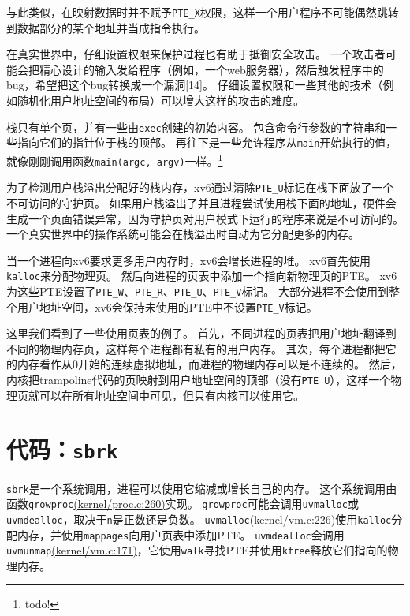 与此类似，在映射数据时并不赋予\texttt{PTE\_X}权限，这样一个用户程序不可能偶然跳转到数据部分的某个地址并当成指令执行。

在真实世界中，仔细设置权限来保护过程也有助于抵御安全攻击。
一个攻击者可能会把精心设计的输入发给程序（例如，一个web服务器），然后触发程序中的bug，希望把这个bug转换成一个漏洞[14]。
仔细设置权限和一些其他的技术（例如随机化用户地址空间的布局）可以增大这样的攻击的难度。

栈只有单个页，并有一些由\texttt{exec}创建的初始内容。
包含命令行参数的字符串和一些指向它们的指针位于栈的顶部。
再往下是一些允许程序从\texttt{main}开始执行的值，就像刚刚调用函数\texttt{main(argc, argv)}一样。\footnote{todo!}

为了检测用户栈溢出分配好的栈内存，xv6通过清除\texttt{PTE\_U}标记在栈下面放了一个不可访问的守护页。
如果用户栈溢出了并且进程尝试使用栈下面的地址，硬件会生成一个页面错误异常，因为守护页对用户模式下运行的程序来说是不可访问的。
一个真实世界中的操作系统可能会在栈溢出时自动为它分配更多的内存。

当一个进程向xv6要求更多用户内存时，xv6会增长进程的堆。
xv6首先使用\texttt{kalloc}来分配物理页。
然后向进程的页表中添加一个指向新物理页的PTE。
xv6为这些PTE设置了\texttt{PTE\_W}、\texttt{PTE\_R}、\texttt{PTE\_U}、\texttt{PTE\_V}标记。
大部分进程不会使用到整个用户地址空间，xv6会保持未使用的PTE中不设置\texttt{PTE\_V}标记。

这里我们看到了一些使用页表的例子。
首先，不同进程的页表把用户地址翻译到不同的物理内存页，这样每个进程都有私有的用户内存。
其次，每个进程都把它的内存看作从0开始的连续虚拟地址，而进程的物理内存可以是不连续的。
然后，内核把trampoline代码的页映射到用户地址空间的顶部（没有\texttt{PTE\_U}），这样一个物理页就可以在所有地址空间中可见，但只有内核可以使用它。

\section{代码：\texttt{sbrk}}
\texttt{sbrk}是一个系统调用，进程可以使用它缩减或增长自己的内存。
这个系统调用由函数\texttt{growproc}\href{https://github.com/mit-pdos/xv6-riscv/blob/riscv/kernel/proc.c#L260}{(kernel/proc.c:260)}实现。
\texttt{growproc}可能会调用\texttt{uvmalloc}或\texttt{uvmdealloc}，取决于\texttt{n}是正数还是负数。
\texttt{uvmalloc}\href{https://github.com/mit-pdos/xv6-riscv/blob/riscv/kernel/vm.c#L226}{(kernel/vm.c:226)}使用\texttt{kalloc}分配内存，并使用\texttt{mappages}向用户页表中添加PTE。
\texttt{uvmdealloc}会调用\texttt{uvmunmap}\href{https://github.com/mit-pdos/xv6-riscv/blob/riscv/kernel/vm.c#L171}{(kernel/vm.c:171)}，它使用\texttt{walk}寻找PTE并使用\texttt{kfree}释放它们指向的物理内存。

